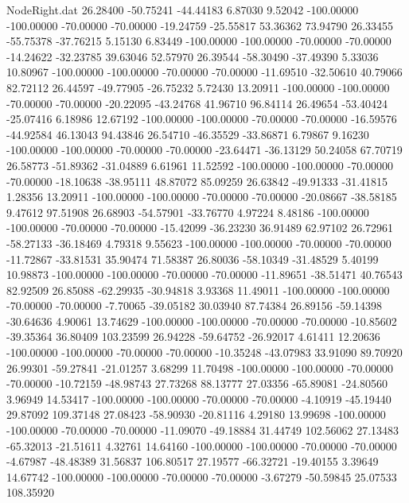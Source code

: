 \begin{filecontents}{NodeRight.dat}
  26.28400  -50.75241  -44.44183     6.87030    9.52042 -100.00000 -100.00000  -70.00000  -70.00000  -19.24759  -25.55817   53.36362   73.94790
  26.33455  -55.75378  -37.76215     5.15130    6.83449 -100.00000 -100.00000  -70.00000  -70.00000  -14.24622  -32.23785   39.63046   52.57970
  26.39544  -58.30490  -37.49390     5.33036   10.80967 -100.00000 -100.00000  -70.00000  -70.00000  -11.69510  -32.50610   40.79066   82.72112
  26.44597  -49.77905  -26.75232     5.72430   13.20911 -100.00000 -100.00000  -70.00000  -70.00000  -20.22095  -43.24768   41.96710   96.84114
  26.49654  -53.40424  -25.07416     6.18986   12.67192 -100.00000 -100.00000  -70.00000  -70.00000  -16.59576  -44.92584   46.13043   94.43846
  26.54710  -46.35529  -33.86871     6.79867    9.16230 -100.00000 -100.00000  -70.00000  -70.00000  -23.64471  -36.13129   50.24058   67.70719
  26.58773  -51.89362  -31.04889     6.61961   11.52592 -100.00000 -100.00000  -70.00000  -70.00000  -18.10638  -38.95111   48.87072   85.09259
  26.63842  -49.91333  -31.41815     1.28356   13.20911 -100.00000 -100.00000  -70.00000  -70.00000  -20.08667  -38.58185    9.47612   97.51908
  26.68903  -54.57901  -33.76770     4.97224    8.48186 -100.00000 -100.00000  -70.00000  -70.00000  -15.42099  -36.23230   36.91489   62.97102
  26.72961  -58.27133  -36.18469     4.79318    9.55623 -100.00000 -100.00000  -70.00000  -70.00000  -11.72867  -33.81531   35.90474   71.58387
  26.80036  -58.10349  -31.48529     5.40199   10.98873 -100.00000 -100.00000  -70.00000  -70.00000  -11.89651  -38.51471   40.76543   82.92509
  26.85088  -62.29935  -30.94818     3.93368   11.49011 -100.00000 -100.00000  -70.00000  -70.00000   -7.70065  -39.05182   30.03940   87.74384
  26.89156  -59.14398  -30.64636     4.90061   13.74629 -100.00000 -100.00000  -70.00000  -70.00000  -10.85602  -39.35364   36.80409  103.23599
  26.94228  -59.64752  -26.92017     4.61411   12.20636 -100.00000 -100.00000  -70.00000  -70.00000  -10.35248  -43.07983   33.91090   89.70920
  26.99301  -59.27841  -21.01257     3.68299   11.70498 -100.00000 -100.00000  -70.00000  -70.00000  -10.72159  -48.98743   27.73268   88.13777
  27.03356  -65.89081  -24.80560     3.96949   14.53417 -100.00000 -100.00000  -70.00000  -70.00000   -4.10919  -45.19440   29.87092  109.37148
  27.08423  -58.90930  -20.81116     4.29180   13.99698 -100.00000 -100.00000  -70.00000  -70.00000  -11.09070  -49.18884   31.44749  102.56062
  27.13483  -65.32013  -21.51611     4.32761   14.64160 -100.00000 -100.00000  -70.00000  -70.00000   -4.67987  -48.48389   31.56837  106.80517
  27.19577  -66.32721  -19.40155     3.39649   14.67742 -100.00000 -100.00000  -70.00000  -70.00000   -3.67279  -50.59845   25.07533  108.35920

\end{filecontents}
